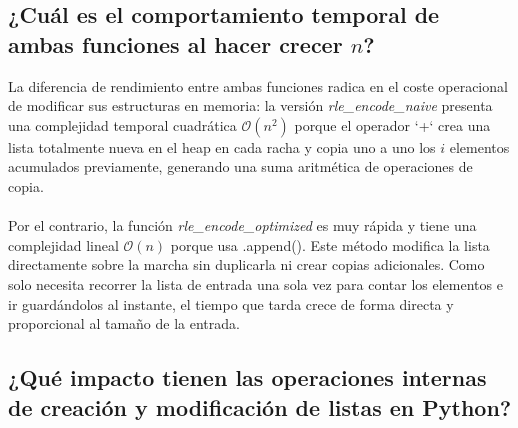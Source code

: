\documentclass{article}
\begin{document}
\subsection{¿Cuál es el comportamiento temporal de ambas funciones al hacer crecer $n$?}

\vspace{0.5cm}

\begin{enumerate}

    La diferencia de rendimiento entre ambas funciones radica en el coste operacional de modificar sus estructuras en memoria: la versión \textit{rle\_encode\_naive} presenta una complejidad temporal cuadrática \textbf{$\mathcal{O}(n^2)$} porque el operador `+` crea una lista totalmente nueva en el heap en cada racha y copia uno a uno los $i$ elementos acumulados previamente, generando una suma aritmética de operaciones de copia.\\
    \\Por el contrario, la función \textit{rle\_encode\_optimized} es muy rápida y tiene una complejidad lineal \textbf{$\mathcal{O}(n)$} porque usa .append(). Este método modifica la lista directamente sobre la marcha sin duplicarla ni crear copias adicionales. Como solo necesita recorrer la lista de entrada una sola vez para contar los elementos e ir guardándolos al instante, el tiempo que tarda crece de forma directa y proporcional al tamaño de la entrada.
    
\end{enumerate}

\vspace{0.5cm}

\subsection{¿Qué impacto tienen las operaciones internas de creación y modificación de listas en Python?}
\end{document}
